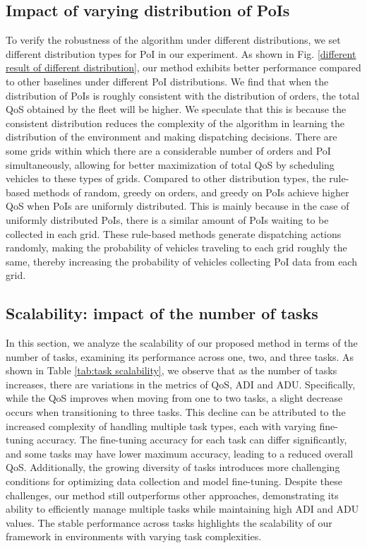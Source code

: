 \subsection{Impact of varying distribution of PoIs} %
To verify the robustness of the algorithm under different distributions, we set different distribution types for PoI in our experiment. As shown in Fig. \ref{different result of different distribution}, our method exhibits better performance compared to other baselines under different PoI distributions. We find that when the distribution of PoIs is roughly consistent with the distribution of orders, the total QoS obtained by the fleet will be higher. We speculate that this is because the consistent distribution reduces the complexity of the algorithm in learning the distribution of the environment and making dispatching decisions. There are some grids within which there are a considerable number of orders and PoI simultaneously, allowing for better maximization of total QoS by scheduling vehicles to these types of grids. Compared to other distribution types, the rule-based methods of random, greedy on orders, and greedy on PoIs achieve higher QoS when PoIs are uniformly distributed. This is mainly because in the case of uniformly distributed PoIs, there is a similar amount of PoIs waiting to be collected in each grid. These rule-based methods generate dispatching actions randomly, making the probability of vehicles traveling to each grid roughly the same, thereby increasing the probability of vehicles collecting PoI data from each grid.


\subsection{Scalability: impact of the number of tasks}
In this section, we analyze the scalability of our proposed method in terms of the number of tasks, examining its performance across one, two, and three tasks. As shown in Table \ref{tab:task scalability}, we observe that as the number of tasks increases, there are variations in the metrics of QoS, ADI and ADU. Specifically, while the QoS improves when moving from one to two tasks, a slight decrease occurs when transitioning to three tasks. This decline can be attributed to the increased complexity of handling multiple task types, each with varying fine-tuning accuracy. The fine-tuning accuracy for each task can differ significantly, and some tasks may have lower maximum accuracy, leading to a reduced overall QoS. Additionally, the growing diversity of tasks introduces more challenging conditions for optimizing data collection and model fine-tuning. Despite these challenges, our method still outperforms other approaches, demonstrating its ability to efficiently manage multiple tasks while maintaining high ADI and ADU values. The stable performance across tasks highlights the scalability of our framework in environments with varying task complexities.

